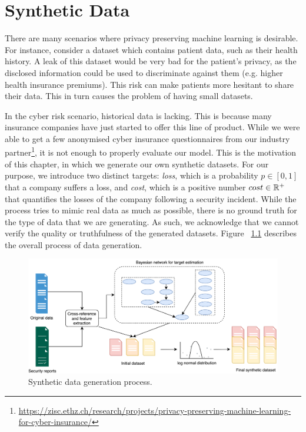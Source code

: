 \chapter{Synthetic Data}\label{chap:synthetic_data}

There are many scenarios where privacy preserving machine learning is desirable. For instance, consider a dataset which contains patient data, such as their health history. A leak of this dataset would be very bad for the patient's privacy, as the disclosed information could be used to discriminate against them (e.g. higher health insurance premiums). This risk can make patients more hesitant to share their data. This in turn causes the problem of having small datasets. 

In the cyber risk scenario, historical data is lacking. This is because many insurance companies have just started to offer this line of product. While we were able to get a few anonymised cyber insurance questionnaires from our industry partner\footnote{\href{https://zisc.ethz.ch/research/projects/privacy-preserving-machine-learning-for-cyber-insurance/}{https://zisc.ethz.ch/research/projects/privacy-preserving-machine-learning-for-cyber-insurance/}}, it is not enough to properly evaluate our model. This is the motivation of this chapter, in which we generate our own synthetic datasets. For our purpose, we introduce two distinct targets: \textit{loss}, which is a probability $p \in [0, 1]$ that a company suffers a loss, and \textit{cost}, which is a positive number $cost \in \mathbb{R}^+$ that quantifies the losses of the company following a security incident. While the process tries to mimic real data as much as possible, there is no ground truth for the type of data that we are generating. As such, we acknowledge that we cannot verify the quality or truthfulness of the generated datasets. Figure ~\ref{fig:data_gen} describes the overall process of data generation.

\begin{figure}[h!]
	\center
	\includegraphics[scale=0.82]{images/synthetic/synthetic_data_complete}
	\caption{\label{fig:data_gen} Synthetic data generation process.}
\end{figure}

